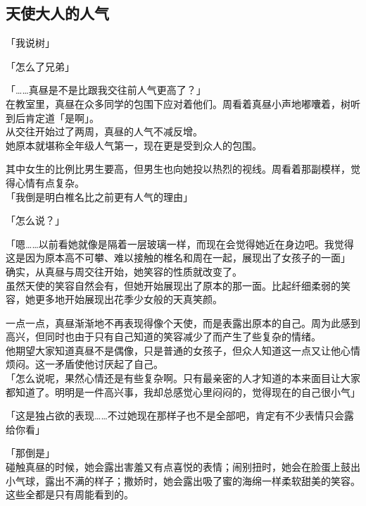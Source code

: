 \subsection{天使大人的人气}

「我说树」

「怎么了兄弟」

「……真昼是不是比跟我交往前人气更高了？」\\

在教室里，真昼在众多同学的包围下应对着他们。周看着真昼小声地嘟囔着，树听到后肯定道「是啊」。\\

从交往开始过了两周，真昼的人气不减反增。\\

她原本就堪称全年级人气第一，现在更是受到众人的包围。

其中女生的比例比男生要高，但男生也向她投以热烈的视线。周看着那副模样，觉得心情有点复杂。\\

「我倒是明白椎名比之前更有人气的理由」

「怎么说？」

「嗯……以前看她就像是隔着一层玻璃一样，而现在会觉得她近在身边吧。我觉得这是因为原本高不可攀、难以接触的椎名和周在一起，展现出了女孩子的一面」\\

确实，从真昼与周交往开始，她笑容的性质就改变了。\\

虽然天使的笑容自然会有，但她开始展现出了原本的那一面。比起纤细柔弱的笑容，她更多地开始展现出花季少女般的天真笑颜。

一点一点，真昼渐渐地不再表现得像个天使，而是表露出原本的自己。周为此感到高兴，但同时也由于只有自己知道的笑容减少了而产生了些复杂的情绪。\\

他期望大家知道真昼不是偶像，只是普通的女孩子，但众人知道这一点又让他心情烦闷。这一矛盾使他讨厌起了自己。\\

「怎么说呢，果然心情还是有些复杂啊。只有最亲密的人才知道的本来面目让大家都知道了。明明是一件高兴事，我却总感觉心里闷闷的，觉得现在的自己很小气」

「这是独占欲的表现……不过她现在那样子也不是全部吧，肯定有不少表情只会露给你看」

「那倒是」\\

碰触真昼的时候，她会露出害羞又有点喜悦的表情；闹别扭时，她会在脸蛋上鼓出小气球，露出不满的样子；撒娇时，她会露出吸了蜜的海绵一样柔软甜美的笑容。这些全都是只有周能看到的。\\

